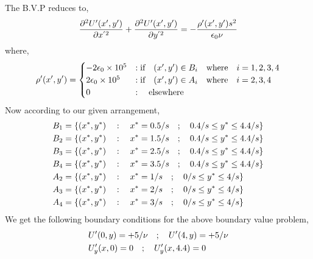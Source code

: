 The B.V.P reduces to,
\begin{equation}
    \frac{\partial^2U'(x',y') }{\partial x^{'2}} + \frac{\partial^2U'(x',y') }{\partial y^{'2}}= -\frac{\rho'(x',y') s^2}{\epsilon_0 \nu} \\
\end{equation}
where,
\begin{equation}
\rho'(x',y') =  \begin{cases}
    -2\epsilon_0 \times 10^5  & :\text{if} \hspace{0.35cm} (x',y') \in B_i \hspace{0.35cm} \text{where} \hspace{0.35cm} i = 1,2,3,4 \\
    2\epsilon_0 \times 10^5 & :\text{if} \hspace{0.35cm} (x',y') \in A_i \hspace{0.35cm} \text{where} \hspace{0.35cm} i = 2,3,4 \\
    0  & : \hspace{0.35cm} \text{elsewhere}
\end{cases}
\end{equation}
Now according to our given arrangement,
\begin{align}
    B_1 &= \{ (x^*,y^*) \hspace{0.35cm} : \hspace{0.35cm} x^*= 0.5/s \hspace{0.35cm};\hspace{0.35cm} 0.4/s \leq y^* \leq 4.4/s \} \\
    B_2 &= \{ (x^*,y^*) \hspace{0.35cm} : \hspace{0.35cm} x^*= 1.5/s \hspace{0.35cm};\hspace{0.35cm} 0.4/s \leq y^* \leq 4.4/s \} \\
    B_3 &= \{ (x^*,y^*) \hspace{0.35cm} : \hspace{0.35cm} x^*= 2.5/s \hspace{0.35cm};\hspace{0.35cm} 0.4/s \leq y^* \leq 4.4/s \} \\
    B_4 &= \{ (x^*,y^*) \hspace{0.35cm} : \hspace{0.35cm} x^*= 3.5/s \hspace{0.35cm};\hspace{0.35cm} 0.4/s \leq y^* \leq 4.4/s \} \\
    A_2 &= \{ (x^*,y^*) \hspace{0.35cm} : \hspace{0.35cm} x^*= 1/s \hspace{0.35cm};\hspace{0.35cm} 0/s \leq y^* \leq 4/s \} \\
    A_3 &= \{ (x^*,y^*) \hspace{0.35cm} : \hspace{0.35cm} x^*= 2/s \hspace{0.35cm};\hspace{0.35cm} 0/s \leq y^* \leq 4/s \} \\
    A_4 &= \{ (x^*,y^*) \hspace{0.35cm} : \hspace{0.35cm} x^*= 3/s \hspace{0.35cm};\hspace{0.35cm} 0/s \leq y^* \leq 4/s \} 
\end{align}
We get the following boundary conditions for the above boundary value problem,
\begin{align}
    & U'(0,y) = +5/\nu \hspace{0.35cm}; \hspace{0.35cm} U'(4,y) = +5/\nu \\ 
    & U'_y(x,0) = 0 \hspace{0.35cm}; \hspace{0.35cm} U'_y(x,4.4) = 0 
\end{align}

